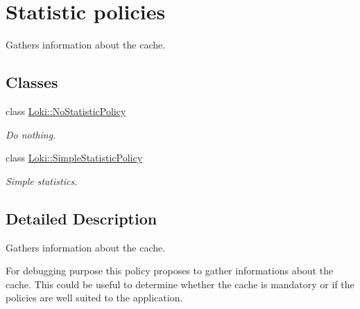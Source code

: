 \hypertarget{group__StatisticPolicyCachedFactoryGroup}{}\section{Statistic policies}
\label{group__StatisticPolicyCachedFactoryGroup}


Gathers information about the cache.  


\subsection*{Classes}
\begin{DoxyCompactItemize}
\item 
class \hyperlink{classLoki_1_1NoStatisticPolicy}{Loki\+::\+No\+Statistic\+Policy}
\begin{DoxyCompactList}\small\item\em Do nothing. \end{DoxyCompactList}\item 
class \hyperlink{classLoki_1_1SimpleStatisticPolicy}{Loki\+::\+Simple\+Statistic\+Policy}
\begin{DoxyCompactList}\small\item\em Simple statistics. \end{DoxyCompactList}\end{DoxyCompactItemize}


\subsection{Detailed Description}
Gathers information about the cache. 

For debugging purpose this policy proposes to gather informations about the cache. This could be useful to determine whether the cache is mandatory or if the policies are well suited to the application. 